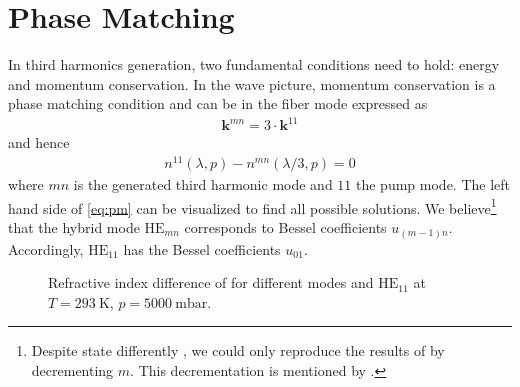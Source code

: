 \documentclass[fleqn, 10pt, twocolumn]{SelfArx}
\begin{document}
    \section{Phase Matching}
    In third harmonics generation, two fundamental conditions need to hold: energy and momentum conservation. 
    In the wave picture, momentum conservation is a phase matching condition and can be in the fiber mode expressed as
    \begin{align}
        \mathbf{k}^{mn} = 3 \cdot \mathbf k^{11} 
    \end{align}
    and hence
    \begin{align}
        n^{11}(\lambda, p) - n^{mn}(\lambda / 3, p)= 0
        \label{eq:pm}
    \end{align}
    where $mn$ is the generated third harmonic mode and $11$ the pump mode. 
    The left hand side of \eqref{eq:pm} can be visualized to find all possible solutions. 
    We believe\footnote{Despite \citeauthor{Travers2011} state differently \cite{Travers2011}, we could only reproduce the results of \citeauthor{Nold2010} by decrementing $m$. This decrementation is mentioned by \citeauthor{Marcatili1964} \cite{Marcatili1964}.} that the hybrid mode $\text{HE}_{mn}$ corresponds to Bessel coefficients $u_{(m-1)n}$. 
    Accordingly, $\text{HE}_{11}$ has the Bessel coefficients $u_{01}$.
    \begin{figure}[h]
        \centering
        \caption{Refractive index difference of  for different  modes and $\text{HE}_{11}$ at $T=\SI{293}{\kelvin}$, $p=\SI{5000}{\milli\bar}$.}
        \label{plt:pm}
    \end{figure}
\end{document}
